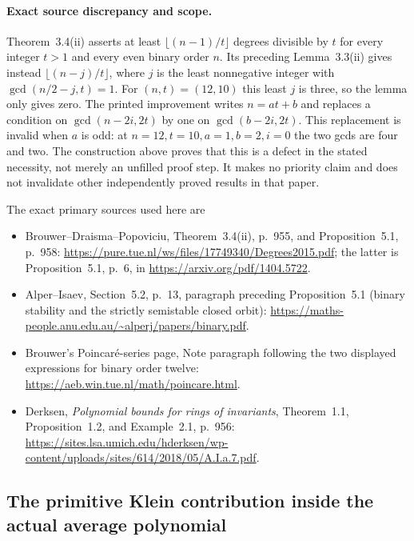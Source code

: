\documentclass[11pt,a4paper]{article}
\begin{document}
\paragraph{Exact source discrepancy and scope.}
Theorem~3.4(ii) asserts at least $\lfloor(n-1)/t\rfloor$
degrees divisible by $t$ for every integer $t>1$ and every
even binary order $n$. Its preceding Lemma~3.3(ii) gives
instead $\lfloor(n-j)/t\rfloor$, where $j$ is the least
nonnegative integer with $\gcd(n/2-j,t)=1$.
For $(n,t)=(12,10)$ this least $j$ is three, so the lemma
only gives zero. The printed improvement writes $n=at+b$
and replaces a condition on $\gcd(n-2i,2t)$ by one on
$\gcd(b-2i,2t)$. This replacement is invalid when $a$ is
odd: at $n=12,t=10,a=1,b=2,i=0$ the two gcds are four
and two. The construction above proves that this is a
defect in the stated necessity, not merely an unfilled
proof step. It makes no priority claim and does not
invalidate other independently proved results in that paper.

The exact primary sources used here are
\begin{itemize}
\item Brouwer--Draisma--Popoviciu, Theorem~3.4(ii), p.~955,
and Proposition~5.1, p.~958:
\url{https://pure.tue.nl/ws/files/17749340/Degrees2015.pdf};
the latter is Proposition~5.1, p.~6, in
\url{https://arxiv.org/pdf/1404.5722}.
\item Alper--Isaev, Section~5.2, p.~13, paragraph preceding
Proposition~5.1 (binary stability and the strictly semistable
closed orbit):
\url{https://maths-people.anu.edu.au/~alperj/papers/binary.pdf}.
\item Brouwer's Poincar\'e-series page, Note paragraph
following the two displayed expressions for binary order
twelve:
\url{https://aeb.win.tue.nl/math/poincare.html}.
\item Derksen, \emph{Polynomial bounds for rings of
invariants}, Theorem~1.1, Proposition~1.2, and Example~2.1,
p.~956:
\url{https://sites.lsa.umich.edu/hderksen/wp-content/uploads/sites/614/2018/05/A.I.a.7.pdf}.
\end{itemize}


\subsection{The primitive Klein contribution inside the actual average polynomial}
\end{document}
